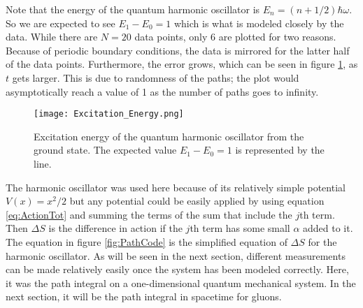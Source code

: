 \documentclass[11pt]{article}
\begin{document}
Note that the energy of the quantum harmonic oscillator is $E_n=(n+1/2)\hbar\omega$. So we are expected to see $E_1-E_0=1$ which is what is modeled closely by the data. While there are $N=20$ data points, only 6 are plotted for two reasons. Because of periodic boundary conditions, the data is mirrored for the latter half of the data points. Furthermore, the error grows, which can be seen in figure \ref{fig:ExciteE}, as $t$ gets larger. This is due to randomness of the paths; the plot would asymptotically reach a value of 1 as the number of paths goes to infinity.

\begin{figure}[h]
	\centering
	\texttt{[image: Excitation\_Energy.png]}
	\caption{Excitation energy of the quantum harmonic oscillator from the ground state. The expected value $E_1-E_0=1$ is represented by the line.}
	\label{fig:ExciteE}
\end{figure}

The harmonic oscillator was used here because of its relatively simple potential $V(x)=x^2/2$ but any potential could be easily applied by using equation \ref{eq:ActionTot} and summing the terms of the sum that include the $j$th term. Then $\Delta S$ is the difference in action if the $j$th term has some small $\alpha$ added to it. The equation in figure \ref{fig:PathCode} is the simplified equation of $\Delta S$ for the harmonic oscillator. As will be seen in the next section, different measurements can be made relatively easily once the system has been modeled correctly. Here, it was the path integral on a one-dimensional quantum mechanical system. In the next section, it will be the path integral in spacetime for gluons.
\end{document}
